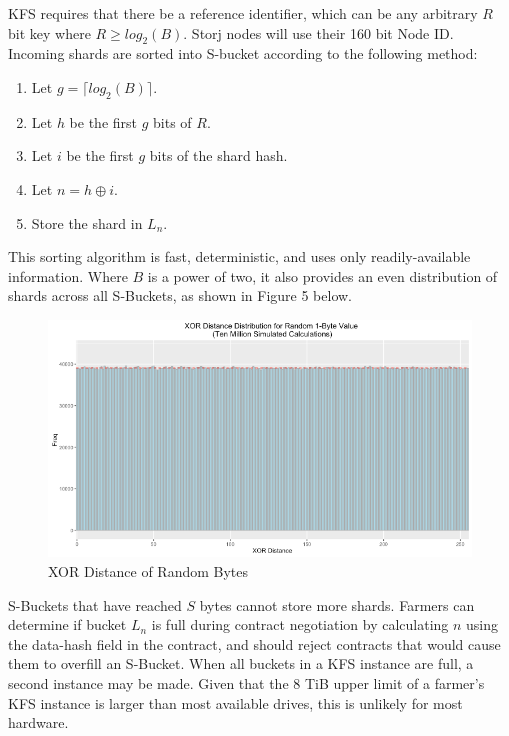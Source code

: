 \documentclass[a4paper,10pt]{article}
\begin{document}
KFS requires that there be a reference identifier, which can be any arbitrary $ R $ bit key where $ R \geq log_{2}(B) $. Storj nodes will use their 160 bit Node ID. Incoming shards are sorted into S-bucket according to the following method:

\begin{enumerate}
\item Let $ g = \lceil log_{2}(B) \rceil $.
\item Let $ h $ be the first $ g $ bits of $ R $.
\item Let $ i $ be the first $ g $ bits of the shard hash.
\item Let $ n = h \oplus i $.
\item Store the shard in $ L_{n} $.
\end{enumerate}

This sorting algorithm is fast, deterministic, and uses only readily-available information. Where $ B $ is a power of two, it also provides an even distribution of shards across all S-Buckets, as shown in Figure 5 below.


\begin{figure}[hbt]
\centering
\includegraphics[width=\linewidth]{5}
\caption{XOR Distance of Random Bytes}
\end{figure}

S-Buckets that have reached $ S $ bytes cannot store more shards. Farmers can determine if bucket $ L_{n} $ is full during contract negotiation by calculating $ n $ using the data-hash field in the contract, and should reject contracts that would cause them to overfill an S-Bucket. When all buckets in a KFS instance are full, a second instance may be made. Given that the 8 TiB upper limit of a farmer’s KFS instance is larger than most available drives, this is unlikely for most hardware.
\end{document}
